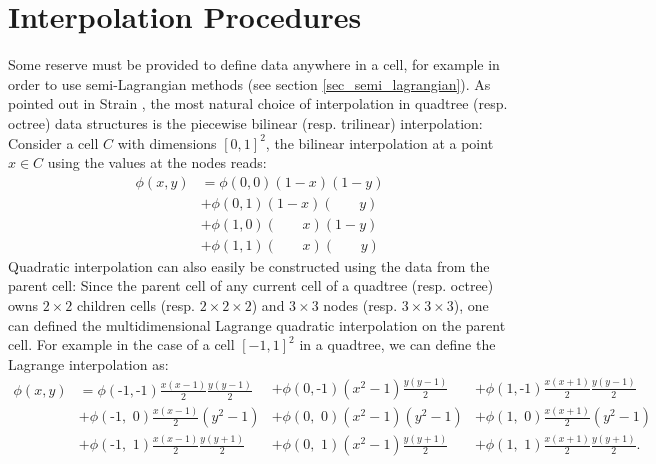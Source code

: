 \documentclass[english]{article}
\begin{document}
\section{Interpolation Procedures\label{sec_interpolation}}
Some reserve must be provided to define data anywhere in a cell, for
example in order to use semi-Lagrangian methods (see section
\ref{sec_semi_lagrangian}). As pointed out in Strain
\cite{Strain:2000:FSL}, the most natural choice of interpolation in
quadtree (resp. octree) data structures is the piecewise bilinear (resp.
trilinear) interpolation: Consider a cell $C$ with dimensions $[0, 1]^2$,
the bilinear interpolation at a point $x \in C$ using the values at the
nodes reads:
\begin{equation}
\begin{split}
\phi(x,y) &= \phi(0,0)(1-x)(1-y) \\
          &+ \phi(0,1)(1-x)(\quad\,\,\,\,\,y) \\
          &+ \phi(1,0)(\quad\,\,\,\,\,x)(1-y) \\
          &+ \phi(1,1)(\quad\,\,\,\,\,x)(\quad\,\,\,\,\,y)
\end{split}
\label{Bilinear_Interpolation}
\end{equation}
Quadratic interpolation can also easily be constructed using the data from the parent cell: Since
the parent cell of any current cell of a quadtree (resp. octree) owns $2\times 2$ children cells
(resp. $2\times 2\times 2$) and $3\times 3$ nodes (resp. $3\times 3\times 3$), one can defined the
multidimensional Lagrange quadratic interpolation on the parent cell. For example in the case of a
cell $[-1, 1]^2$ in a quadtree, we can define the Lagrange interpolation as:
\begin{equation*}
\begin{aligned}
\phi(x,y) &= \phi(\textrm{-1},\textrm{-1})\frac{x(x-1)}2\frac{y(y-1)}2 \\
          &+ \phi(\textrm{-1},\,\,      0)\frac{x(x-1)}2(y^2-1)        \\
          &+ \phi(\textrm{-1},\,\,      1)\frac{x(x-1)}2\frac{y(y+1)}2
\end{aligned}
\begin{aligned}
+ \phi(0,\textrm{-1})(x^2-1)\frac{y(y-1)}2 &+ \phi(1,\textrm{-1})\frac{x(x+1)}2\frac{y(y-1)}2 \\
+ \phi(0,\,\,      0)(x^2-1)(y^2-1)        &+ \phi(1,\,\,     0)\frac{x(x+1)}2(y^2-1)        \\
+ \phi(0,\,\,      1)(x^2-1)\frac{y(y+1)}2 &+ \phi(1,\,\,
1)\frac{x(x+1)}2\frac{y(y+1)}2.
\end{aligned}
\end{equation*}
\end{document}
